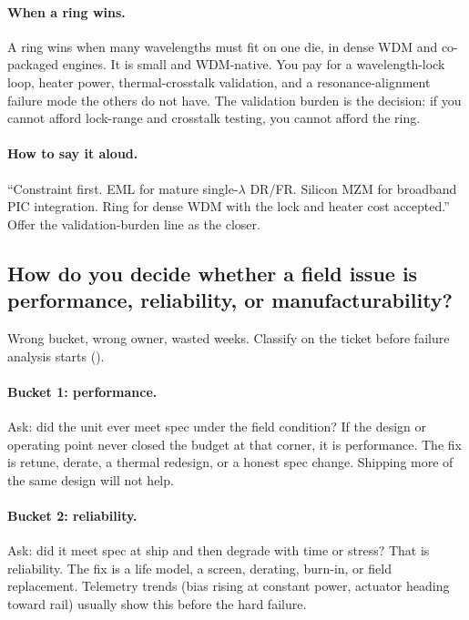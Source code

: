 \paragraph{When a ring wins.}
A ring wins when many wavelengths must fit on one die, in
dense WDM and co-packaged engines. It is small and WDM-native.
You pay for a wavelength-lock loop, heater power, thermal-crosstalk
validation, and a resonance-alignment failure mode
the others do not have. The validation burden is the decision: if you cannot
afford lock-range and crosstalk testing, you cannot afford the ring.

\paragraph{How to say it aloud.}
``Constraint first. EML for mature single-$\lambda$ DR/FR. Silicon MZM for
broadband PIC integration. Ring for dense WDM with the lock and heater cost
accepted.'' Offer the validation-burden line as the closer.

\subsection{How do you decide whether a field issue is performance,
reliability, or manufacturability?}
\label{sec:interview-worked-triage-class}

Wrong bucket, wrong owner, wasted weeks. Classify on the ticket before
failure analysis starts ().

\paragraph{Bucket 1: performance.}
Ask: did the unit ever meet spec under the field condition? If the design or
operating point never closed the budget at that corner, it is performance.
The fix is retune, derate, a thermal redesign, or a honest spec change.
Shipping more of the same design will not help.

\paragraph{Bucket 2: reliability.}
Ask: did it meet spec at ship and then degrade with time or stress? That is
reliability. The fix is a life model, a screen, derating, burn-in, or field
replacement. Telemetry trends (bias rising at constant power, actuator
heading toward rail) usually show this before the hard failure.

